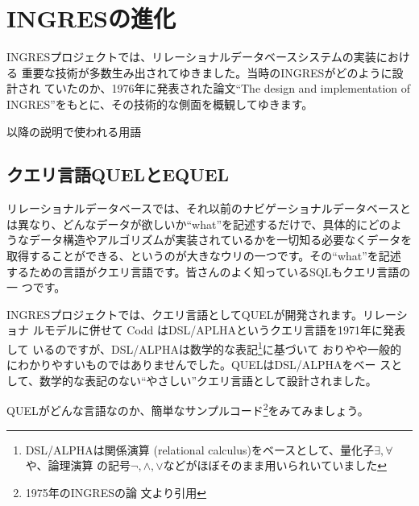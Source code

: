 \section{INGRESの進化}


INGRESプロジェクトでは、リレーショナルデータベースシステムの実装における
重要な技術が多数生み出されてゆきました。当時のINGRESがどのように設計され
ていたのか、1976年に発表された論文``The design and implementation of
INGRES''をもとに、その技術的な側面を概観してゆきます。


\begin{center}
 \begin{minipage}{0.95\textwidth}
  \begin{screen}
   以降の説明で使われる用語


   \footnotesize




  \end{screen}
 \end{minipage}
 \vspace*{0.6\Cvs}
\end{center}


\subsection{クエリ言語QUELとEQUEL}


リレーショナルデータベースでは、それ以前のナビゲーショナルデータベースと
は異なり、どんなデータが欲しいか``what''を記述するだけで、具体的にどのよ
うなデータ構造やアルゴリズムが実装されているかを一切知る必要なくデータを
取得することができる、というのが大きなウリの一つです。その``what''を記述
するための言語がクエリ言語です。皆さんのよく知っているSQLもクエリ言語の一
つです。


INGRESプロジェクトでは、クエリ言語としてQUELが開発されます。リレーショナ
ルモデルに併せて Codd はDSL/APLHAというクエリ言語を1971年に発表して
いるのですが、DSL/ALPHAは数学的な表記\footnote{DSL/ALPHAは関係演算
(relational calculus)をベースとして、量化子$\exists, \forall$や、論理演算
の記号$\lnot,\land,\lor$などがほぼそのまま用いられいていました}に基づいて
おりやや一般的にわかりやすいものではありませんでした。QUELはDSL/ALPHAをベー
スとして、数学的な表記のない``やさしい''クエリ言語として設計されました。


QUELがどんな言語なのか、簡単なサンプルコード\footnote{1975年のINGRESの論
文より引用}をみてみましょう。

